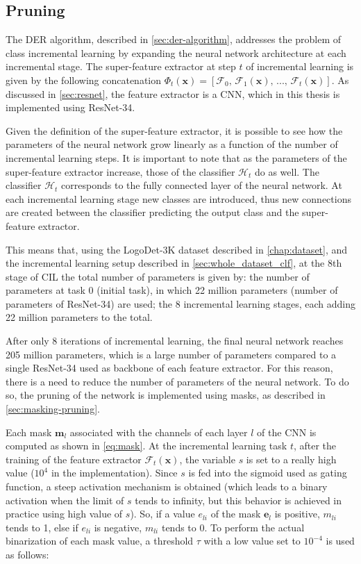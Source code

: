 \subsection{Pruning}
\label{sec:method-pruning}

The DER algorithm, described in \autoref{sec:der-algorithm}, addresses the problem of class incremental learning by expanding the neural network architecture at each incremental stage. The super-feature extractor at step $t$ of incremental learning is given by the following concatenation $\Phi_t(\mathbf{x}) = [\mathcal{F}_0, \, \mathcal{F}_1(\mathbf{x}), \, ..., \, \mathcal{F}_t(\mathbf{x})]$. As discussed in \autoref{sec:resnet}, the feature extractor is a CNN, which in this thesis is implemented using ResNet-34.

Given the definition of the super-feature extractor, it is possible to see how the parameters of the neural network grow linearly as a function of the number of incremental learning steps.
It is important to note that as the parameters of the super-feature extractor increase, those of the classifier $\mathcal{H}_t$ do as well.
The classifier $\mathcal{H}_t$ corresponds to the fully connected layer of the neural network. At each incremental learning stage new classes are introduced, thus new connections are created between the classifier predicting the output class and the super-feature extractor.

This means that, using the LogoDet-3K dataset described in \autoref{chap:dataset}, and the incremental learning setup described in \autoref{sec:whole_dataset_clf}, at the 8th stage of CIL the total number of parameters is given by: the number of parameters at task 0 (initial task), in which 22 million parameters (number of parameters of ResNet-34) are used; the 8 incremental learning stages, each adding 22 million parameters to the total.

After only 8 iterations of incremental learning, the final neural network reaches 205 million parameters, which is a large number of parameters compared to a single ResNet-34 used as backbone of each feature extractor.
For this reason, there is a need to reduce the number of parameters of the neural network.
To do so, the pruning of the network is implemented using masks, as described in \autoref{sec:masking-pruning}.

Each mask $\mathbf{m}_l$ associated with the channels of each layer $l$ of the CNN is computed as shown in \autoref{eq:mask}.
At the incremental learning task $t$, after the training of the feature extractor $\mathcal{F}_t(\mathbf{x})$, the variable $s$ is set to a really high value ($10^{4}$ in the implementation).
Since $s$ is fed into the sigmoid used as gating function, a steep activation mechanism is obtained (which leads to a binary activation when the limit of $s$ tends to infinity, but this behavior is achieved in practice using high value of $s$).
So, if a value $e_{li}$ of the mask $\mathbf{e}_l$ is positive, $m_{li}$ tends to 1, else if $e_{li}$ is negative, $m_{li}$ tends to 0.
To perform the actual binarization of each mask value, a threshold $\tau$ with a low value set to $10^{-4}$ is used as follows:

